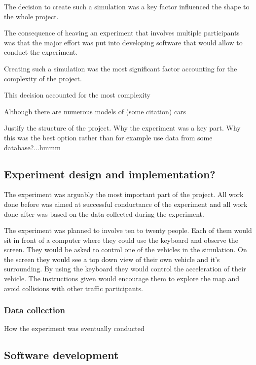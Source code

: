 \documentclass[11pt]{article}
\begin{document}
The decision to create such a simulation was a key factor influenced the shape to the whole project. 


The consequence of heaving an experiment that involves multiple participants was that the major effort was put into developing software that would allow to conduct the experiment.  



Creating such a simulation was the most significant factor accounting for the complexity of the project. 



This decision accounted for the most complexity 



Although there are numerous models of (some citation) cars 


Justify the structure of the project. Why the experiment was a key part. Why this was
the best option rather than for example use data from some database?...hmmm

\subsection{Experiment design and implementation?}
The experiment was arguably the most important part of the project. All work done before was aimed at successful conductance of the experiment and all work done after was based on the data collected during the experiment. 



The experiment was planned to involve ten to twenty people. Each of them would sit in front of a computer where they could use the keyboard and observe the screen. They would be asked to control one of the vehicles in the simulation. On the screen they would see a top down view of their own vehicle and it's surrounding. By using the keyboard they would control the acceleration of their vehicle.
The instructions given would encourage them to explore the map and avoid collisions with other traffic participants.





\subsubsection{Data collection}

How the experiment was eventually conducted

\subsection{Software development}
\end{document}
